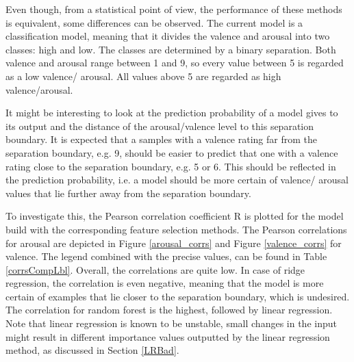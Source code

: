 Even though, from a statistical point of view, the performance of these methods is equivalent, some differences can be observed. The current model is a classification model, meaning that it divides the valence and arousal into two classes: high and low. The classes are determined by a binary separation. Both valence and arousal range between 1 and 9, so every value between 5 is regarded as a low valence/ arousal. All values above 5 are regarded as high valence/arousal.

\npar

It might be interesting to look at the prediction probability of a model gives to its output and the distance of the arousal/valence level to this separation boundary. It is expected that a samples with a valence rating far from the separation boundary, e.g. 9, should be easier to predict that one with a valence rating close to the separation boundary, e.g. 5 or 6. This should be reflected in the prediction probability, i.e. a model should be more certain of valence/ arousal values that lie further away from the separation boundary.

\npar

To investigate this, the Pearson correlation coefficient R is plotted for the model build with the corresponding feature selection methods. The Pearson correlations for arousal are depicted in Figure \ref{arousal_corrs} and Figure \ref{valence_corrs} for valence. The legend combined with the precise values, can be found in Table \ref{corrsCompLbl}. Overall, the correlations are quite low. In case of ridge regression, the correlation is even negative, meaning that the model is more certain of examples that lie closer to the separation boundary, which is undesired. The correlation for random forest is the highest, followed by linear regression. Note that linear regression is known to be unstable, small changes in the input might result in different importance values outputted by the linear regression method, as discussed in Section \ref{LRBad}.


